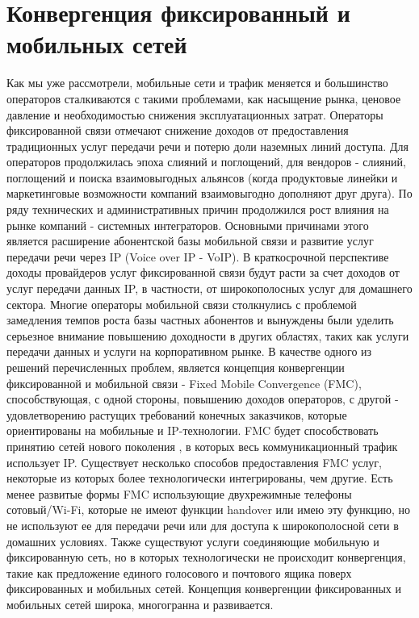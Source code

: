 \section{Конвергенция фиксированный и мобильных сетей} \label{sect1_1}
Как мы уже рассмотрели, мобильные сети и трафик меняется и большинство операторов сталкиваются с такими проблемами, как насыщение рынка, ценовое давление и необходимостью снижения эксплуатационных затрат. Операторы фиксированной связи отмечают снижение доходов от предоставления традиционных услуг передачи речи и потерю доли наземных линий доступа. Для операторов продолжилась эпоха слияний и поглощений, для вендоров - слияний, поглощений и поиска взаимовыгодных альянсов (когда продуктовые линейки и маркетинговые возможности компаний взаимовыгодно дополняют друг друга). По ряду технических и административных причин продолжился рост влияния на рынке компаний - системных интеграторов. Основными причинами этого является расширение абонентской базы мобильной связи и развитие услуг передачи речи через IP (Voice over IP - VoIP). В краткосрочной перспективе доходы провайдеров услуг фиксированной связи будут расти за счет доходов от услуг передачи данных IP, в частности, от широкополосных услуг для домашнего сектора.  Многие операторы мобильной связи столкнулись с проблемой замедления темпов роста базы частных абонентов и вынуждены были уделить серьезное внимание повышению доходности в других областях, таких как услуги передачи данных и услуги на корпоративном рынке. В качестве одного из решений перечисленных проблем, является концепция конвергенции фиксированной и мобильной связи - Fixed Mobile Convergence (FMC), способствующая, с одной стороны, повышению доходов операторов, с другой - удовлетворению растущих требований конечных заказчиков, которые ориентированы на мобильные и IP-технологии. FMC будет способствовать принятию сетей нового поколения \cite{FMC}, в которых весь коммуникационный трафик использует IP.
Существует несколько способов предоставления FMC услуг, некоторые из которых более технологически интегрированы, чем другие. Есть менее развитые формы FMC использующие двухрежимные телефоны сотовый/Wi-Fi, которые не имеют функции handover или имею эту функцию, но не используют ее для передачи речи или для доступа к широкополосной сети в домашних условиях. Также существуют услуги соединяющие мобильную и фиксированную сеть, но в которых технологически не происходит конвергенция, такие как предложение единого голосового и почтового ящика поверх фиксированных и мобильных сетей.
Концепция конвергенции фиксированных и мобильных сетей широка, многогранна и развивается. 



